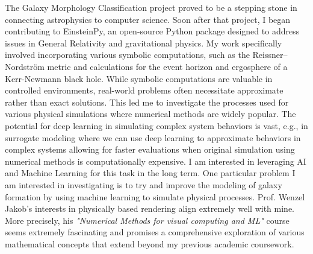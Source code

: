 \documentclass{article}
\begin{document}
\hspace{0.25in}The Galaxy Morphology Classification project proved to be a
stepping stone in connecting astrophysics to computer science. Soon after that
project, I began contributing to EinsteinPy, an open-source Python package
designed to address issues in General Relativity and gravitational physics. My
work specifically involved incorporating various symbolic computations, such as
the Reissner–Nordström metric and calculations for the event horizon and
ergosphere of a Kerr-Newmann black hole. While symbolic computations are
valuable in controlled environments, real-world problems often necessitate
approximate rather than exact solutions. This led me to investigate the
processes used for various physical simulations where numerical methods are
widely popular. The potential for deep learning in simulating complex system
behaviors is vast, e.g., in surrogate modeling where we can use deep learning to
approximate behaviors in complex systems allowing for faster evaluations when
original simulation using numerical methods is computationally expensive. I am
interested in leveraging AI and Machine Learning for this task in the long term.
One particular problem I am interested in investigating is to try and improve
the modeling of galaxy formation by using machine learning to simulate physical
processes. Prof. Wenzel Jakob's interests in physically based rendering align
extremely well with mine. More precisely, his \textit{"Numerical Methods for visual
computing and ML"} course seems extremely fascinating and promises a
comprehensive exploration of various mathematical concepts that extend beyond my
previous academic coursework. 
\vspace{3pt}
\end{document}
